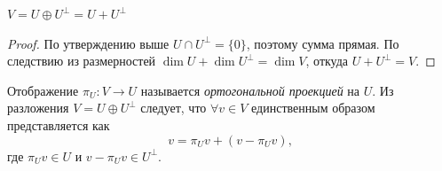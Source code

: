 \begin{cor}
	$V = U \oplus U^\perp = U + U^\perp $
	\begin{proof}
		По утверждению выше $U \cap U^\perp = \{0\}$, поэтому сумма прямая. По следствию из размерностей $\dim U + \dim U^\perp = \dim V$, откуда $U + U^\perp = V$.
	\end{proof}
\end{cor}

\begin{definition}
	Отображение $\pi_U : V \to U$ называется \emph{ортогональной проекцией} на $U$. Из разложения $V = U \oplus U^\perp$ следует, что $\forall v \in V$ единственным образом представляется как
	\[
		v = \pi_U v + (v - \pi_U v),
	\]
	где $\pi_U v \in U$ и $v - \pi_U v \in U^\perp$.
\end{definition}


